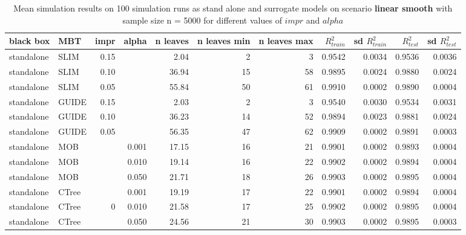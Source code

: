 \begin{table}[!htb]

\caption{Mean simulation results on 100 simulation runs as stand alone and surrogate models on scenario \textbf{linear smooth} with sample size n = 5000 for different values of $impr$ and $alpha$}
\centering \tiny
\begin{tabular}[t]{l|l|r|r|r|r|r|r|r|r|r}
\hline
black box & MBT & impr & alpha & n leaves & n leaves min & n leaves max &  $R^2_{train}$ & sd $R^2_{train}$ & $R^2_{test}$ & sd $R^2_{test}$\\

\hline

standalone & SLIM & 0.15 & & 2.04 & 2 & 3 & 0.9542 & 0.0034 & 0.9536 & 0.0036\\
standalone & SLIM & 0.10 & & 36.94 & 15 & 58 & 0.9895 & 0.0024 & 0.9880 & 0.0024\\
standalone & SLIM & 0.05 & & 55.84 & 50 & 61 & 0.9910 & 0.0002 & 0.9890 & 0.0004\\
standalone & GUIDE & 0.15 & & 2.03 & 2 & 3 & 0.9540 & 0.0030 & 0.9534 & 0.0031\\
standalone & GUIDE & 0.10 & & 36.23 & 14 & 52 & 0.9894 & 0.0023 & 0.9881 & 0.0024\\
standalone & GUIDE & 0.05 & & 56.35 & 47 & 62 & 0.9909 & 0.0002 & 0.9891 & 0.0003\\
standalone & MOB & & 0.001 & 17.15 & 16 & 21 & 0.9901 & 0.0002 & 0.9893 & 0.0004\\
standalone & MOB & & 0.010 & 19.14 & 16 & 22 & 0.9902 & 0.0002 & 0.9894 & 0.0004\\
standalone & MOB & & 0.050 & 21.71 & 18 & 26 & 0.9903 & 0.0002 & 0.9895 & 0.0004\\
standalone & CTree & & 0.001 & 19.19 & 17 & 22 & 0.9901 & 0.0002 & 0.9894 & 0.0004\\
standalone & CTree &0 & 0.010 & 21.58 & 17 & 25 & 0.9902 & 0.0002 & 0.9895 & 0.0004\\
standalone & CTree & & 0.050 & 24.56 & 21 & 30 & 0.9903 & 0.0002 & 0.9895 & 0.0003\\



\end{tabular}
\end{table}
